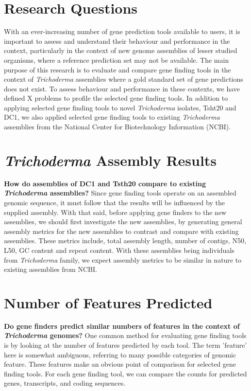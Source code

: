\section{Research Questions}

With an ever-increasing number of gene prediction tools available to
users, it is important to assess and understand their behaviour and
performance in the context, particularly in the context of new genome
assemblies of lesser studied organisms, where a reference prediction
set may not be available. The main purpose of this research is to
evaluate and compare gene finding tools in the context of
\textit{Trichoderma} assemblies where a gold standard set of gene
predictions does not exist. To assess behaviour and performance in
these contexts, we have defined X problems to profile the selected
gene finding tools. In addition to applying selected gene finding
tools to novel \textit{Trichoderma} isolates, Tsht20 and DC1, we also
applied selected gene finding tools to existing \textit{Trichoderma}
assemblies from the National Center for Biotechnology Information
(NCBI).

\section{\textit{Trichoderma} Assembly Results}

\textbf{How do assemblies of DC1 and Tsth20 compare to existing
  \textit{Trichoderma} assemblies?} Since gene finding tools operate
on an assembled genomic sequence, it must follow that the results will
be influenced by the supplied assembly. With that said, before
applying gene finders to the new assemblies, we should first
investigate the new assemblies, by generating general assembly metrics
for the new assemblies to contrast and compare with existing
assemblies. These metrics include, total assembly length, number of
contigs, N50, L50, GC content and repeat content. With these
assemblies being individuals from \textit{Trichoderma} family, we
expect assembly metrics to be similar in nature to existing assemblies
from NCBI.

\section{Number of Features Predicted}

\textbf{Do gene finders predict similar numbers of features in the
  context of \textit{Trichoderma} genomes?} One common method for
evaluating gene finding tools is by looking at the number of features
predicted by each tool. The term 'feature' here is somewhat ambiguous,
referring to many possible categories of genomic feature. These
features make an obvious point of comparison for selected gene finding
tools. For each gene finding tool, we can compare the counts for
predicted genes, transcripts, and coding sequences.

